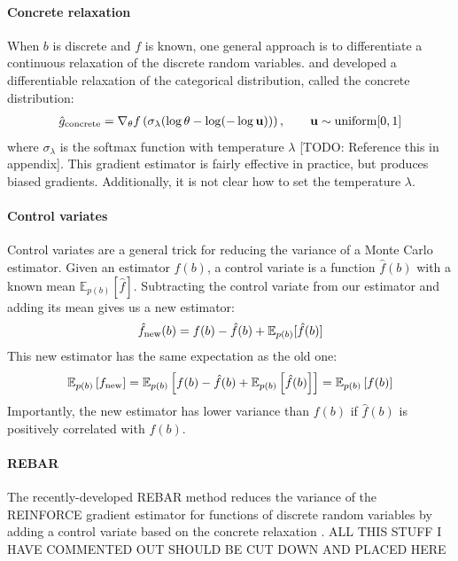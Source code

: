 \documentclass{article}
\newcommand{\controlf}{\hat f}  %
\newcommand{\vu}{\mathbf{u}}
\begin{document}
\paragraph{Concrete relaxation}
When $b$ is discrete and $f$ is known, one general approach is to differentiate a continuous relaxation of the discrete random variables.
\cite{maddison2016concrete} and \cite{jang2016categorical} developed a differentiable relaxation of the categorical distribution, called the concrete distribution:
%
\begin{align}
\hat g_\textnormal{concrete} = \nabla_\theta f \left( \sigma_\lambda ( \log \theta - \log(-\log \vu)) \right), \qquad \vu \sim \textnormal{uniform}[0, 1] 
\end{align}
%
where $\sigma_\lambda$ is the softmax function with temperature $\lambda$ [TODO: Reference this in appendix].
This gradient estimator is fairly effective in practice, but produces biased gradients.
Additionally, it is not clear how to set the temperature $\lambda$.

\paragraph{Control variates}
Control variates are a general trick for reducing the variance of a Monte Carlo estimator.
Given an estimator $f(b)$, a control variate is a function $\controlf(b)$ with a known mean $\mathbb{E}_{p(b)} [ \controlf ]$.
Subtracting the control variate from our estimator and adding its mean gives us a new estimator:
%
\begin{align}
\hat f_\textnormal{new}(b) = f(b) - \controlf(b) + \mathbb{E}_{p(b)}[\controlf(b)]
\end{align}
%
This new estimator has the same expectation as the old one:
%
\begin{align}
\mathbb{E}_{p(b)}\left[ f_\textnormal{new} \right] 
= \mathbb{E}_{p(b)}\left[f(b) - \controlf(b) + \mathbb{E}_{p(b)} \left[ \controlf(b) \right] \right]
= \mathbb{E}_{p(b)}\left[ f(b) \right]
\end{align}
%
Importantly, the new estimator has lower variance than $f(b)$ if $\controlf(b)$ is positively correlated with $f(b)$.

\paragraph{REBAR}
The recently-developed REBAR method \citep{tucker2017rebar} reduces the variance of the REINFORCE gradient estimator for functions of discrete random variables by adding a control variate based on the concrete relaxation \citep{maddison2016concrete, jang2016categorical}.
ALL THIS STUFF I HAVE COMMENTED OUT SHOULD BE CUT DOWN AND PLACED HERE
\end{document}
